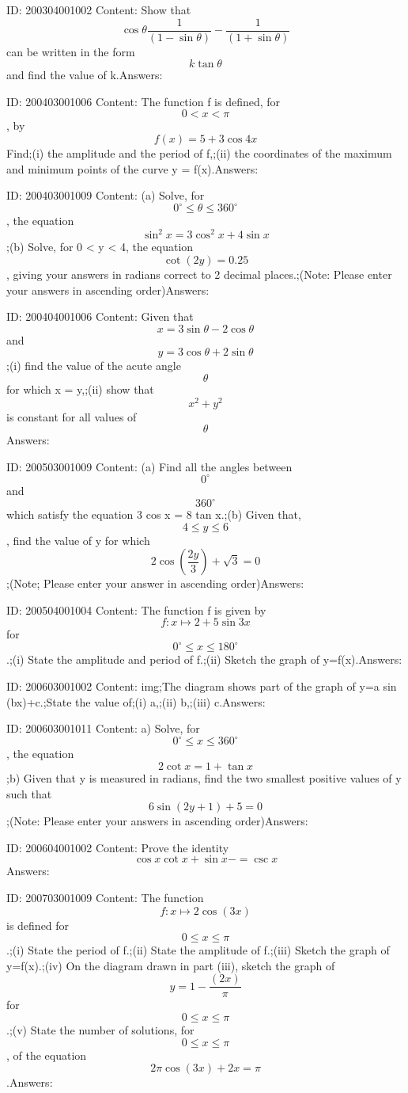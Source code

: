 \documentclass{article}
\begin{document}
ID: 200304001002
Content:
Show that $$\cos\theta\frac{1}{(1-\sin \theta)}-\frac{1}{(1+\sin \theta)}$$ can be written in the form $$k \tan \theta$$ and find the value of k.Answers:

ID: 200403001006
Content:
The function f is defined, for $$0< x<\pi$$, by $$f(x) = 5 + 3 \cos  4x$$ Find;(i)	the amplitude and the period of f,;(ii)	the coordinates of the maximum and minimum points of the curve y = f(x).Answers:

ID: 200403001009
Content:
(a)	Solve, for $$0^{\circ}\leq\theta\leq360^{\circ}$$, the equation $$\sin ^2x=3\cos ^2x+4\sin x$$;(b)	Solve, for 0 < y < 4, the equation $$\cot (2y)=0.25$$, giving your answers in radians correct to 2 decimal places.;(Note: Please enter your answers in ascending order)Answers:

ID: 200404001006
Content:
Given that $$x=3\sin \theta - 2\cos  \theta$$ and $$y=3\cos  \theta + 2\sin  \theta$$;(i)	find the value of the acute angle $$\theta$$ for which x = y,;(ii)	show that $$x^2+y^2$$ is constant for all values of $$\theta$$Answers:

ID: 200503001009
Content:
(a) Find all the angles between $$0^{\circ}$$ and $$360^{\circ}$$ which satisfy the equation 3 cos  x = 8 tan  x.;(b)	Given that, $$4\leq y\leq6$$, find the value of y for which $$2\cos (\frac{2y}{3})+\sqrt3=0$$;(Note; Please enter your answer in ascending order)Answers:

ID: 200504001004
Content:
The function f is given by $$f: x \mapsto 2+5\sin 3x$$ for $$0 ^{\circ}\leq x\leq180 ^{\circ}$$.;(i) State the amplitude and period of f.;(ii)	Sketch the graph of y=f(x).Answers:

ID: 200603001002
Content:
img;The diagram shows part of the graph of y=a sin (bx)+c.;State the value of;(i)	a,;(ii)	b,;(iii)	c.Answers:

ID: 200603001011
Content:
a)	Solve, for $$0^{\circ}\leq x\leq360^{\circ}$$, the equation $$2 \cot x =1 + \tan  x$$;b)	Given that y is measured in radians, find the two smallest positive values of y such that $$6 \sin  (2y + 1) + 5 = 0$$;(Note: Please enter your answers in ascending order)Answers:

ID: 200604001002
Content:
Prove the identity $$\cos x\cot x+\sin x-=\csc x$$Answers:

ID: 200703001009
Content:
The function $$f:x \mapsto 2\cos (3x)$$ is defined for $$0\leq x\leq \pi$$.;(i) State the period of f.;(ii) State the amplitude of f.;(iii) Sketch the graph of y=f(x).;(iv) On the diagram drawn in part (iii), sketch the graph of $$y=1-\frac{(2x)}{\pi}$$ for $$0\leq x\leq \pi$$.;(v) State the number of solutions, for $$0\leq x\leq\pi$$, of the equation $$2\pi \cos (3x)+2x=\pi$$.Answers:
\end{document}
